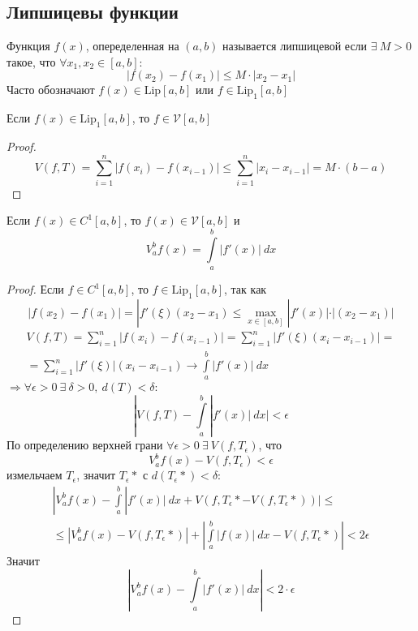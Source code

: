 \subsection{Липшицевы функции}
\begin{definition}
Функция $f(x)$, опеределенная на $(a,b)$ называется липшицевой если $\exists\ M>0$ такое, что $\forall x_1,x_2\in [a,b]:$
\[|f(x_2)-f(x_1)|\leq M\cdot |x_2-x_1|\]
Часто обозначают $f(x)\in \text{Lip}[a,b]$ или $f\in \text{Lip}_1[a,b]$
\end{definition} 
\begin{theorem}
    Если $f(x)\in \text{Lip}_1[a,b]$, то $f\in \mathcal{V}[a,b]$
\end{theorem} 
\begin{proof}
    \[V(f,T)=\sum\limits_{i=1}^{n}|f(x_i)-f(x_{i-1})|\leq \sum\limits_{i=1}^{n}|x_i-x_{i-1}|=M\cdot (b-a)\]
\end{proof} 
\begin{theorem}
    Если $f(x)\in C^1[a,b]$, то $f(x)\in \mathcal{V}[a,b]$ и 
    \[V_a^b f(x)=\int\limits_{a}^{b}|f'(x)|\ dx\]
\end{theorem} 
\begin{proof}
    Если $f\in C^1[a,b]$, то $f\in \text{Lip}_1[a,b]$, так как
    \[|f(x_2)-f(x_1)|=|f'(\xi)(x_2-x_1)\leq \max\limits_{x\in [a,b]}|f'(x)|\cdot|(x_2-x_1)|\]
    \begin{multline*}
        V(f, T)=\sum\limits_{i=1}^{n}|f(x_i)-f(x_{i-1})|=\sum\limits_{i=1}^{n} |f'(\xi)(x_i-x_{i-1})|=\\
        =\sum\limits_{i=1}^{n} |f'(\xi)| (x_i-x_{i-1})\to \int\limits_{a}^{b}|f'(x)|\ dx
    \end{multline*}
    $\Rightarrow \forall \epsilon>0\ \exists\ \delta>0,\ d(T)<\delta:$
    \[|V(f,T)-\int\limits_{a}^{b}|f'(x)|\ dx|<\epsilon\]
    По определению верхней грани $\forall \epsilon>0\ \exists\ V(f,T_{\epsilon})$, что
    \[V_a^b f(x)-V(f,T_{\epsilon})<\epsilon\]
    измельчаем $T_{\epsilon}$, значит $T_{\epsilon}*$ с $d(T_{\epsilon}*)<\delta$:
    \begin{multline*}
        |V_a^b f(x)-\int\limits_{a}^{b}|f'(x)|\ dx+V(f,T_{\epsilon}*-V(f, T_{\epsilon}*))|\leq\\
        \leq |V_a^b f(x)-V(f, T_{\epsilon}*)|+\left|\int\limits_{a}^{b}|f(x)|\ dx-V(f,T_{\epsilon}*)\right|<2\epsilon
    \end{multline*}
    Значит
    \[\left|V_a^b f(x)-\int\limits_{a}^{b}|f'(x)|\ dx \right|<2\cdot \epsilon\]
\end{proof}
